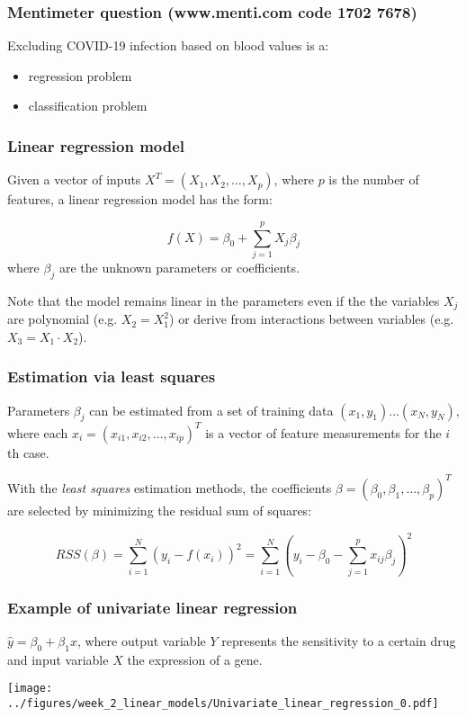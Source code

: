 \documentclass[notes]{beamer}          %
\begin{document}
\begin{frame}
\frametitle{Mentimeter question (www.menti.com code 1702 7678)}

Excluding COVID-19 infection based on blood values is a:
\begin{itemize}
    \item regression problem
    \item classification problem
\end{itemize}
\end{frame}

\begin{frame}
\frametitle{Linear regression model}
Given a vector of inputs $X^T = (X_1, X_2, \dots, X_p)$, where $p$ is the number of features, a linear regression model has the form:

\begin{equation*}
f(X)=\beta_0 + \sum_{j=1}^p X_j\beta_j
\end{equation*}
where $\beta_j$ are the unknown parameters or coefficients. 

\vspace{5mm} 

Note that the model remains linear in the parameters even if the the variables $X_j$ are polynomial (e.g. $X_2 = X_1^2$) or derive from interactions between variables (e.g. $X_3 = X_1 \cdot X_2$).

\end{frame}

\begin{frame}
\frametitle{Estimation via least squares}
Parameters $\beta_j$ can be estimated from a set of training data $(x_1,y_1) \dots (x_N,y_N)$, where each $x_i=(x_{i1}, x_{i2}, \dots, x_{ip})^T$ is a vector of feature measurements for the $i$th case.

\vspace{5mm} 

With the \textit{least squares} estimation methods, the coefficients $\beta=(\beta_0, \beta_1, \dots, \beta_p)^T$ are selected by minimizing the residual sum of squares:

\begin{equation*}
RSS(\beta) = \sum_{i=1}^N (y_i - f(x_i))^2 = \sum_{i=1}^N (y_i - \beta_0 -  \sum_{j=1}^p x_{ij}\beta_j)^2
\end{equation*}
\end{frame}

\begin{frame}
\frametitle{Example of univariate linear regression}
$\hat{y} = \beta_0 + \beta_1 x$, where output variable $Y$ represents the sensitivity to a certain drug and input variable $X$ the expression of a gene.

\begin{center}
\texttt{[image: ../figures/week\_2\_linear\_models/Univariate\_linear\_regression\_0.pdf]}
\end{center}

\end{frame}
\end{document}
